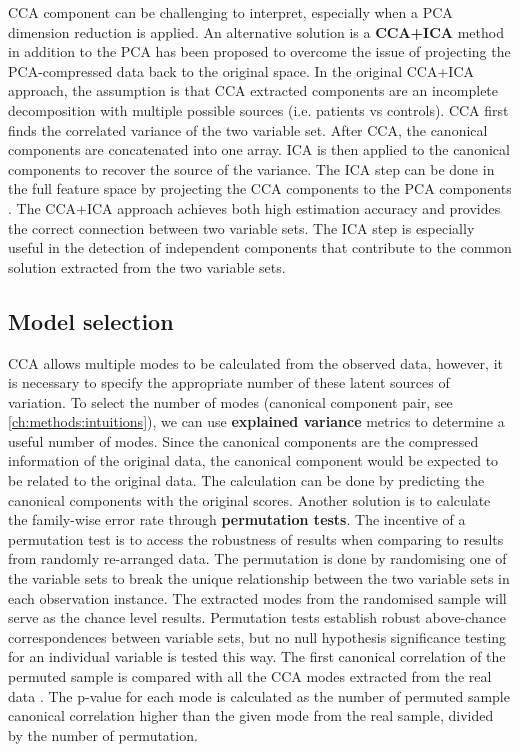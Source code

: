 CCA component can be challenging to interpret, especially when a PCA dimension reduction is applied. An alternative solution is a \textbf{CCA+ICA} method in addition to the PCA \cite{MillerK2016,Sui2010} has been proposed to overcome the issue of projecting the PCA-compressed data back to the original space. In the original CCA+ICA approach, the assumption is that CCA extracted components are an incomplete decomposition with multiple possible sources (i.e. patients vs controls). CCA first finds the correlated variance of the two variable set. After CCA, the canonical components are concatenated into one array. ICA is then applied to the canonical components to recover the source of the variance. The ICA step can be done in the full feature space by projecting the CCA components to the PCA components \cite{MillerK2016}. The CCA+ICA approach achieves both high estimation accuracy and provides the correct connection between two variable sets. The ICA step is especially useful in the detection of independent components that contribute to the common solution extracted from the two variable sets.

\subsection{Model selection}
CCA allows multiple modes to be calculated from the observed data, however, it is necessary to specify the appropriate number of these latent sources of variation. To select the number of modes (canonical component pair, see \cref{ch:methods:intuitions}), we can use \textbf{explained variance} metrics to determine a useful number of modes. Since the canonical components are the compressed information of the original data, the canonical component would be expected to be related to the original data. The calculation can be done by predicting the canonical components with the original scores. Another solution is to calculate the family-wise error rate through \textbf{permutation tests}. The incentive of a permutation test is to access the robustness of results when comparing to results from randomly re-arranged data. The permutation is done by randomising one of the variable sets to break the unique relationship between the two variable sets in each observation instance. The extracted modes from the randomised sample will serve as the chance level results. Permutation tests establish robust above-chance correspondences between variable sets, but no null hypothesis significance testing for an individual variable is tested this way. The first canonical correlation of the permuted sample is compared with all the CCA modes extracted from the real data . The p-value for each mode is calculated as the number of permuted sample canonical correlation higher than the given mode from the real sample, divided by the number of permutation.

